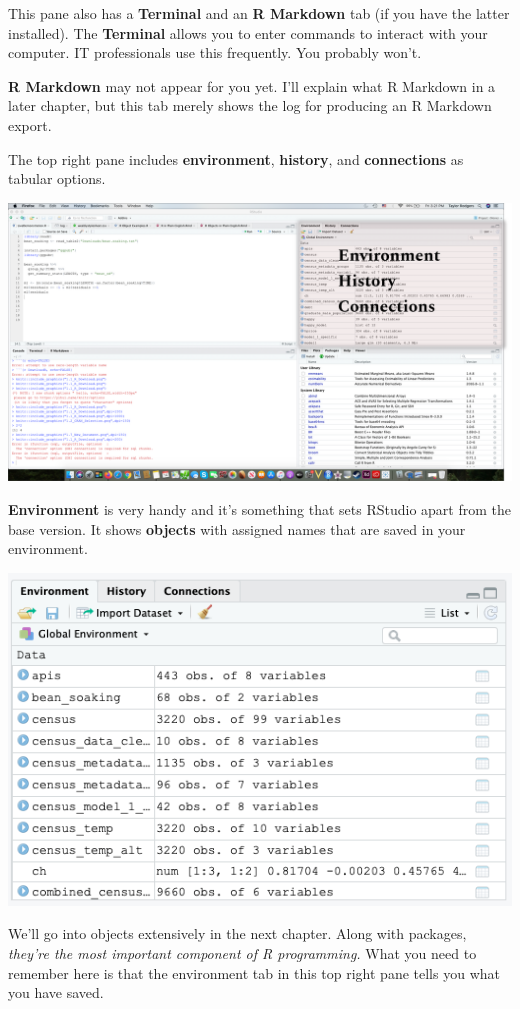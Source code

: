 \documentclass[
]{book}
\begin{document}
This pane also has a \textbf{Terminal} and an \textbf{R Markdown} tab (if you have the latter installed). The \textbf{Terminal} allows you to enter commands to interact with your computer. IT professionals use this frequently. You probably won't.

\textbf{R Markdown} may not appear for you yet. I'll explain what R Markdown in a later chapter, but this tab merely shows the log for producing an R Markdown export.

The top right pane includes \textbf{environment}, \textbf{history}, and \textbf{connections} as tabular options.

\begin{center}\includegraphics[width=0.75\linewidth]{1.19_RStudio_EnvironmentOthers} \end{center}

\textbf{Environment} is very handy and it's something that sets RStudio apart from the base version. It shows \textbf{objects} with assigned names that are saved in your environment.

\begin{center}\includegraphics[width=0.75\linewidth]{1.20_Environment_Tab} \end{center}

We'll go into objects extensively in the next chapter. Along with packages, \emph{they're the most important component of R programming.} What you need to remember here is that the environment tab in this top right pane tells you what you have saved.
\end{document}
